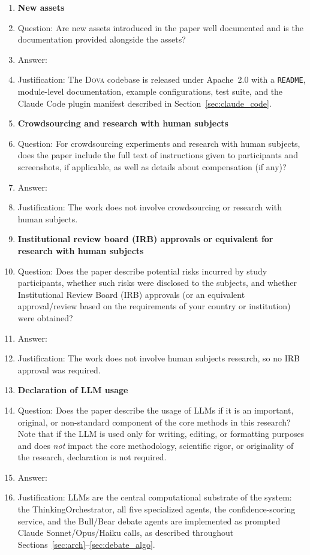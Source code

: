 \documentclass{article}
\theoremstyle{plain}
\theoremstyle{definition}
\newcommand{\dova}{\textsc{Dova}}
\begin{document}
\begin{enumerate}
\item {\bf New assets}
    \item[] Question: Are new assets introduced in the paper well documented and is the documentation provided alongside the assets?
    \item[] Answer: \answerYes{}
    \item[] Justification: The \dova{} codebase is released under Apache~2.0 with a \texttt{README}, module-level documentation, example configurations, test suite, and the Claude Code plugin manifest described in Section~\ref{sec:claude_code}.

\item {\bf Crowdsourcing and research with human subjects}
    \item[] Question: For crowdsourcing experiments and research with human subjects, does the paper include the full text of instructions given to participants and screenshots, if applicable, as well as details about compensation (if any)?
    \item[] Answer: \answerNA{}
    \item[] Justification: The work does not involve crowdsourcing or research with human subjects.

\item {\bf Institutional review board (IRB) approvals or equivalent for research with human subjects}
    \item[] Question: Does the paper describe potential risks incurred by study participants, whether such risks were disclosed to the subjects, and whether Institutional Review Board (IRB) approvals (or an equivalent approval/review based on the requirements of your country or institution) were obtained?
    \item[] Answer: \answerNA{}
    \item[] Justification: The work does not involve human subjects research, so no IRB approval was required.

\item {\bf Declaration of LLM usage}
    \item[] Question: Does the paper describe the usage of LLMs if it is an important, original, or non-standard component of the core methods in this research? Note that if the LLM is used only for writing, editing, or formatting purposes and does \emph{not} impact the core methodology, scientific rigor, or originality of the research, declaration is not required.
    \item[] Answer: \answerYes{}
    \item[] Justification: LLMs are the central computational substrate of the system: the ThinkingOrchestrator, all five specialized agents, the confidence-scoring service, and the Bull/Bear debate agents are implemented as prompted Claude Sonnet/Opus/Haiku calls, as described throughout Sections~\ref{sec:arch}--\ref{sec:debate_algo}.

\end{enumerate}
\end{document}

